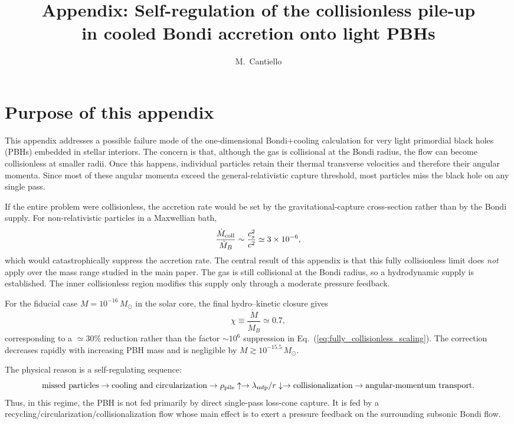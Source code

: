 \documentclass[12pt]{article}
\title{Appendix: Self-regulation of the collisionless pile-up\\
       in cooled Bondi accretion onto light PBHs}
\author{M.\ Cantiello}
\date{}
\newcommand{\Msun}{M_\odot}
\newcommand{\Mdot}{\dot{M}}
\newcommand{\MdotB}{\dot{M}_B}
\newcommand{\mfp}{\lambda_{\rm mfp}}
\begin{document}
\maketitle

\section{Purpose of this appendix}
\label{app:purpose}

This appendix addresses a possible failure mode of the one-dimensional
Bondi+cooling calculation for very light primordial black holes (PBHs)
embedded in stellar interiors. The concern is that, although the gas is
collisional at the Bondi radius, the flow can become collisionless at
smaller radii. Once this happens, individual particles retain their
thermal transverse velocities and therefore their angular momenta. Since
most of these angular momenta exceed the general-relativistic capture
threshold, most particles miss the black hole on any single pass.

If the entire problem were collisionless, the accretion rate would be set
by the gravitational-capture cross-section rather than by the Bondi
supply. For non-relativistic particles in a Maxwellian bath,
\begin{equation}
  \frac{\Mdot_{\rm coll}}{\MdotB}
  \sim \frac{c_s^2}{c^2}
  \simeq 3\times10^{-6},
  \label{eq:fully_collisionless_scaling}
\end{equation}
which would catastrophically suppress the accretion rate. The central
result of this appendix is that this fully collisionless limit does
\emph{not} apply over the mass range studied in the main paper. The gas
is still collisional at the Bondi radius, so a hydrodynamic supply is
established. The inner collisionless region modifies this supply only
through a moderate pressure feedback.

For the fiducial case $M=10^{-16}\,\Msun$ in the solar core, the final
hydro--kinetic closure gives
\begin{equation}
  \chi \equiv \frac{\Mdot}{\MdotB} \simeq 0.7,
  \label{eq:chi_fiducial_intro}
\end{equation}
corresponding to a $\simeq 30\%$ reduction rather than the factor
$\sim 10^6$ suppression in Eq.~(\ref{eq:fully_collisionless_scaling}).
The correction decreases rapidly with increasing PBH mass and is
negligible by $M\gtrsim10^{-15.5}\,\Msun$.

The physical reason is a self-regulating sequence:
\begin{equation}
  \hbox{missed particles}
  \rightarrow \hbox{cooling and circularization}
  \rightarrow \rho_{\rm pile}\uparrow
  \rightarrow \mfp/r\downarrow
  \rightarrow \hbox{collisionalization}
  \rightarrow \hbox{angular-momentum transport}.
\end{equation}
Thus, in this regime, the PBH is not fed primarily by direct single-pass
loss-cone capture. It is fed by a
recycling/circularization/collisionalization flow whose main effect is to
exert a pressure feedback on the surrounding subsonic Bondi flow.
\end{document}
